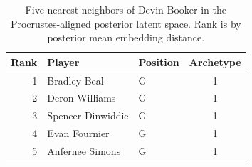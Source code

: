 \begin{table}[htbp]
  \centering\small
  \begin{tabular}{rllc}
    \toprule
    Rank & Player & Position & Archetype \\
    \midrule
    1 & Bradley Beal & G & 1 \\
    2 & Deron Williams & G & 1 \\
    3 & Spencer Dinwiddie & G & 1 \\
    4 & Evan Fournier & G & 1 \\
    5 & Anfernee Simons & G & 1 \\
    \bottomrule
  \end{tabular}
  \caption{Five nearest neighbors of Devin Booker in the Procrustes-aligned posterior latent space. Rank is by posterior mean embedding distance.}
  \label{tab:Devin_Booker_neighbors}
\end{table}

